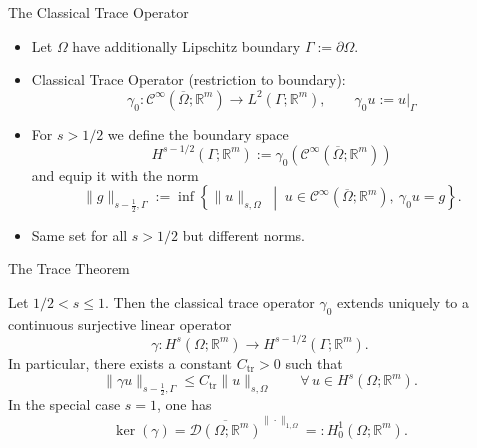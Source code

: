 \documentclass[10pt,aspectratio=169]{beamer}
\def\R{{\mathbb R}}
\def\cC{{\mathcal C}}
\def\cD{{\mathcal D}}
\def\tr{{\mathrm{tr}}}
\begin{document}
\begin{frame}{The Classical Trace Operator}
	\begin{itemize}
		\item Let $\Omega$ have additionally Lipschitz boundary $\Gamma:= \partial\Omega$.
		\item Classical Trace Operator (restriction to boundary):
		      \begin{equation*}
			      \gamma_0:\cC^\infty(\overline{\Omega};\R^m)\to L^2(\Gamma;\R^m),
			      \qquad
			      \gamma_0 u:=u|_\Gamma
		      \end{equation*}
		\item For $s>1/2$ we define the boundary space
		      \begin{equation*}
			      H^{s-1/2}(\Gamma;\R^m):= \gamma_0(\cC^\infty(\overline{\Omega};\R^m))
		      \end{equation*}
		      and equip it with the norm
		      \begin{equation*}
			      \|g\|_{s-\tfrac12,\Gamma}
			      :=
			      \inf\left\{
			      \|u\|_{s,\Omega}
			      \;\middle|\;
			      u\in \cC^\infty(\overline{\Omega};\R^m),\ \gamma_0 u=g
			      \right\}.
		      \end{equation*}
		\item Same set for all $s>1/2$ but different norms.
	\end{itemize}
\end{frame}

\begin{frame}{The Trace Theorem}
	\begin{theorem}
		Let $1/2< s\le 1$. Then the classical trace operator $\gamma_0$ extends uniquely to a continuous surjective linear operator
		\begin{equation*}
			\gamma:H^s(\Omega;\R^m)\to H^{s-1/2}(\Gamma;\R^m).
		\end{equation*}
		In particular, there exists a constant $C_{\tr}>0$ such that
		\begin{equation*}
			\|\gamma u\|_{s-\tfrac12,\Gamma}\le C_{\tr}\|u\|_{s,\Omega}
			\qquad\forall\,u\in H^s(\Omega;\R^m).
		\end{equation*}
		In the special case $s=1$, one has
		\begin{equation*}
			\ker(\gamma)=\overline{\cD(\Omega;\R^m)}^{\|\cdot\|_{1,\Omega}}=:H_0^1(\Omega;\R^m).
		\end{equation*}
	\end{theorem}
\end{frame}
\end{document}

